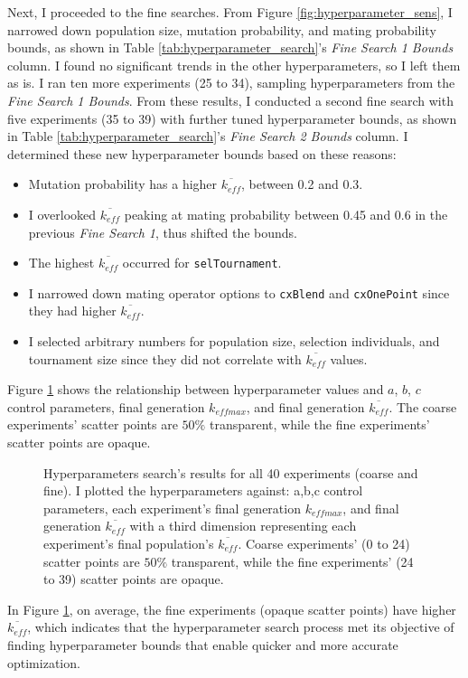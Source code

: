Next, I proceeded to the fine searches. 
From Figure \ref{fig:hyperparameter_sens}, I narrowed down population size, 
mutation probability, and mating probability bounds, as shown in Table 
\ref{tab:hyperparameter_search}'s \textit{Fine Search 1 Bounds} column. 
I found no significant trends in the other hyperparameters, so I left them 
as is. 
I ran ten more experiments (25 to 34), sampling hyperparameters from 
the \textit{Fine Search 1 Bounds}. 
From these results, I conducted a second fine search with five experiments 
(35 to 39) with further tuned hyperparameter bounds, as shown in Table 
\ref{tab:hyperparameter_search}'s \textit{Fine Search 2 Bounds} column. 
I determined these new hyperparameter bounds based on these reasons: 
\begin{itemize}
    \item Mutation probability has a higher $\overline{k_{eff}}$, between 0.2 and 0.3.
    \item I overlooked $\overline{k_{eff}}$  peaking at mating probability between 
    0.45 and 0.6 in the previous \textit{Fine Search 1}, thus shifted the bounds. 
    \item The highest $\overline{k_{eff}}$ occurred for \texttt{selTournament}. 
    \item I narrowed down mating operator options to \texttt{cxBlend} and 
    \texttt{cxOnePoint} since they had higher $\overline{k_{eff}}$. 
    \item I selected arbitrary numbers for population size, 
    selection individuals, and tournament size since they did not 
    correlate with $\overline{k_{eff}}$ values. 
\end{itemize}
Figure \ref{fig:input_hyperparameters_sens} shows the relationship between 
hyperparameter values and $a$, $b$, $c$ control parameters, final generation 
$k_{eff max}$, and final generation $\overline{k_{eff}}$. 
The coarse experiments' scatter points are $50\%$ transparent, while the fine 
experiments' scatter points are opaque. 
\begin{figure}[]
    \centering
    \caption{Hyperparameters search's results for all 40 experiments (coarse 
    and fine). I plotted the hyperparameters against: a,b,c control parameters, 
    each experiment's final generation $k_{eff max}$, and final generation 
    $\overline{k_{eff}}$ with a third dimension representing each experiment's final 
    population's $\overline{k_{eff}}$. Coarse experiments' (0 to 24) scatter points 
    are $50\%$ transparent, while the fine experiments' (24 to 39) scatter points 
    are opaque. }
    \label{fig:input_hyperparameters_sens}
\end{figure}
In Figure \ref{fig:input_hyperparameters_sens}, on average, the fine experiments 
(opaque scatter points) have higher $\overline{k_{eff}}$, which indicates that the
hyperparameter search process met its objective of finding hyperparameter 
bounds that enable quicker and more accurate optimization. 

